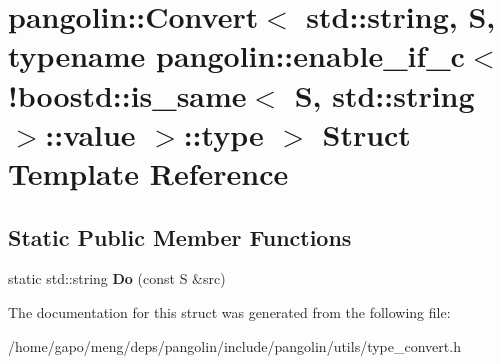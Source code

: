 \hypertarget{structpangolin_1_1_convert_3_01std_1_1string_00_01_s_00_01typename_01pangolin_1_1enable__if__c_3664d08d7238157e37db033a565859915}{}\section{pangolin\+:\+:Convert$<$ std\+:\+:string, S, typename pangolin\+:\+:enable\+\_\+if\+\_\+c$<$ !boostd\+:\+:is\+\_\+same$<$ S, std\+:\+:string $>$\+:\+:value $>$\+:\+:type $>$ Struct Template Reference}
\label{structpangolin_1_1_convert_3_01std_1_1string_00_01_s_00_01typename_01pangolin_1_1enable__if__c_3664d08d7238157e37db033a565859915}
\subsection*{Static Public Member Functions}
\begin{DoxyCompactItemize}
\item 
static std\+::string {\bfseries Do} (const S \&src)\hypertarget{structpangolin_1_1_convert_3_01std_1_1string_00_01_s_00_01typename_01pangolin_1_1enable__if__c_3664d08d7238157e37db033a565859915_adb20284b06426daf9ff05c84a684a6ed}{}\label{structpangolin_1_1_convert_3_01std_1_1string_00_01_s_00_01typename_01pangolin_1_1enable__if__c_3664d08d7238157e37db033a565859915_adb20284b06426daf9ff05c84a684a6ed}

\end{DoxyCompactItemize}


The documentation for this struct was generated from the following file\+:\begin{DoxyCompactItemize}
\item 
/home/gapo/meng/deps/pangolin/include/pangolin/utils/type\+\_\+convert.\+h\end{DoxyCompactItemize}
